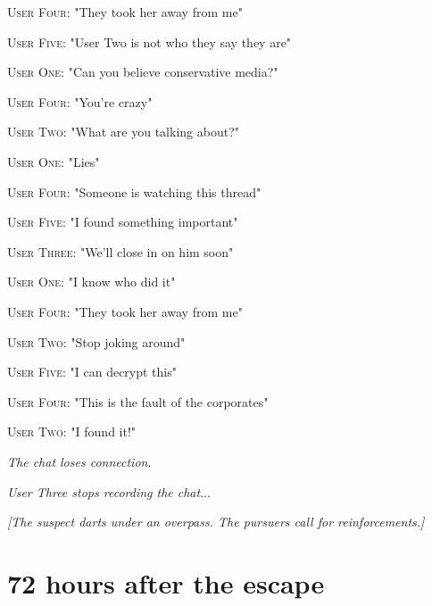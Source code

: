 \documentclass{report}
\begin{document}
\textsc{User Four}: "They took her away from me" 

\textsc{User Five}: "User Two is not who they say they are" 

\textsc{User One}: "Can you believe conservative media?" 

\textsc{User Four}: "You're crazy" 

\textsc{User Two}: "What are you talking about?" 

\textsc{User One}: "Lies" 

\textsc{User Four}: "Someone is watching this thread" 

\textsc{User Five}: "I found something important" 

\textsc{User Three}: "We'll close in on him soon" 

\textsc{User One}: "I know who did it" 

\textsc{User Four}: "They took her away from me" 

\textsc{User Two}: "Stop joking around" 

\textsc{User Five}: "I can decrypt this" 

\textsc{User Four}: "This is the fault of the corporates" 

\textsc{User Two}: "I found it!" 

\textit{The chat loses connection}. 

\textit{User Three stops recording the chat}...

\textit{[The suspect darts under an overpass. The pursuers call for reinforcements.]}


\section*{72 \small{hours after the escape}}
\end{document}
